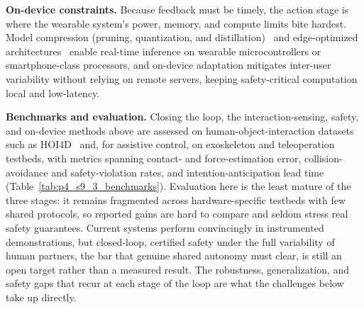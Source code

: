 \textbf{On-device constraints.} Because feedback must be timely, the action stage is where the wearable system's power, memory, and compute limits bite hardest. Model compression (pruning, quantization, and distillation)~\cite{hinton2015distilling} and edge-optimized architectures~\cite{howard2017mobilenets} enable real-time inference on wearable microcontrollers or smartphone-class processors, and on-device adaptation mitigates inter-user variability without relying on remote servers, keeping safety-critical computation local and low-latency.

\textbf{Benchmarks and evaluation.} Closing the loop, the interaction-sensing, safety, and on-device methods above are assessed on human-object-interaction datasets such as HOI4D~\cite{HOI4D} and, for assistive control, on exoskeleton and teleoperation testbeds, with metrics spanning contact- and force-estimation error, collision-avoidance and safety-violation rates, and intention-anticipation lead time (Table~\ref{tab:p4_s9_3_benchmarks}). 
Evaluation here is the least mature of the three stages: it remains fragmented across hardware-specific testbeds with few shared protocols, so reported gains are hard to compare and seldom stress real safety guarantees. 
Current systems perform convincingly in instrumented demonstrations, but closed-loop, certified safety under the full variability of human partners, the bar that genuine shared autonomy must clear, is still an open target rather than a measured result. The robustness, generalization, and safety gaps that recur at each stage of the loop are what the challenges below take up directly.



